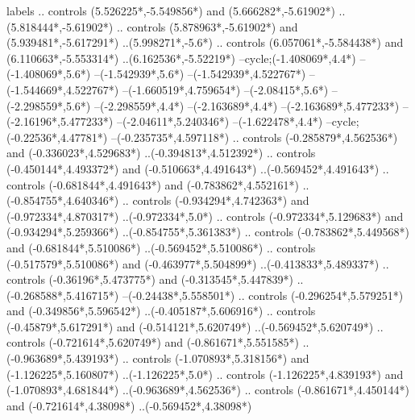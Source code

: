 {\begin{scope}[x=1mm,y=1mm,line width=\SCstroke mm,line cap=round,line join=round]
\begin{SCpart}{labels}
.. controls ({5.526225*\SCF},{-5.549856*\SCF}) and ({5.666282*\SCF},{-5.61902*\SCF}) ..({5.818444*\SCF},{-5.61902*\SCF})
.. controls ({5.878963*\SCF},{-5.61902*\SCF}) and ({5.939481*\SCF},{-5.617291*\SCF}) ..({5.998271*\SCF},{-5.6*\SCF})
.. controls ({6.057061*\SCF},{-5.584438*\SCF}) and ({6.110663*\SCF},{-5.553314*\SCF}) ..({6.162536*\SCF},{-5.52219*\SCF})
--cycle; ({-1.408069*\SCF},{4.4*\SCF})
--({-1.408069*\SCF},{5.6*\SCF})
--({-1.542939*\SCF},{5.6*\SCF})
--({-1.542939*\SCF},{4.522767*\SCF})
--({-1.544669*\SCF},{4.522767*\SCF})
--({-1.660519*\SCF},{4.759654*\SCF})
--({-2.08415*\SCF},{5.6*\SCF})
--({-2.298559*\SCF},{5.6*\SCF})
--({-2.298559*\SCF},{4.4*\SCF})
--({-2.163689*\SCF},{4.4*\SCF})
--({-2.163689*\SCF},{5.477233*\SCF})
--({-2.16196*\SCF},{5.477233*\SCF})
--({-2.04611*\SCF},{5.240346*\SCF})
--({-1.622478*\SCF},{4.4*\SCF})
--cycle;
 ({-0.22536*\SCF},{4.47781*\SCF})
--({-0.235735*\SCF},{4.597118*\SCF})
.. controls ({-0.285879*\SCF},{4.562536*\SCF}) and ({-0.336023*\SCF},{4.529683*\SCF}) ..({-0.394813*\SCF},{4.512392*\SCF})
.. controls ({-0.450144*\SCF},{4.493372*\SCF}) and ({-0.510663*\SCF},{4.491643*\SCF}) ..({-0.569452*\SCF},{4.491643*\SCF})
.. controls ({-0.681844*\SCF},{4.491643*\SCF}) and ({-0.783862*\SCF},{4.552161*\SCF}) ..({-0.854755*\SCF},{4.640346*\SCF})
.. controls ({-0.934294*\SCF},{4.742363*\SCF}) and ({-0.972334*\SCF},{4.870317*\SCF}) ..({-0.972334*\SCF},{5.0*\SCF})
.. controls ({-0.972334*\SCF},{5.129683*\SCF}) and ({-0.934294*\SCF},{5.259366*\SCF}) ..({-0.854755*\SCF},{5.361383*\SCF})
.. controls ({-0.783862*\SCF},{5.449568*\SCF}) and ({-0.681844*\SCF},{5.510086*\SCF}) ..({-0.569452*\SCF},{5.510086*\SCF})
.. controls ({-0.517579*\SCF},{5.510086*\SCF}) and ({-0.463977*\SCF},{5.504899*\SCF}) ..({-0.413833*\SCF},{5.489337*\SCF})
.. controls ({-0.36196*\SCF},{5.473775*\SCF}) and ({-0.313545*\SCF},{5.447839*\SCF}) ..({-0.268588*\SCF},{5.416715*\SCF})
--({-0.24438*\SCF},{5.558501*\SCF})
.. controls ({-0.296254*\SCF},{5.579251*\SCF}) and ({-0.349856*\SCF},{5.596542*\SCF}) ..({-0.405187*\SCF},{5.606916*\SCF})
.. controls ({-0.45879*\SCF},{5.617291*\SCF}) and ({-0.514121*\SCF},{5.620749*\SCF}) ..({-0.569452*\SCF},{5.620749*\SCF})
.. controls ({-0.721614*\SCF},{5.620749*\SCF}) and ({-0.861671*\SCF},{5.551585*\SCF}) ..({-0.963689*\SCF},{5.439193*\SCF})
.. controls ({-1.070893*\SCF},{5.318156*\SCF}) and ({-1.126225*\SCF},{5.160807*\SCF}) ..({-1.126225*\SCF},{5.0*\SCF})
.. controls ({-1.126225*\SCF},{4.839193*\SCF}) and ({-1.070893*\SCF},{4.681844*\SCF}) ..({-0.963689*\SCF},{4.562536*\SCF})
.. controls ({-0.861671*\SCF},{4.450144*\SCF}) and ({-0.721614*\SCF},{4.38098*\SCF}) ..({-0.569452*\SCF},{4.38098*\SCF})

\end{SCpart}
\end{scope}}
